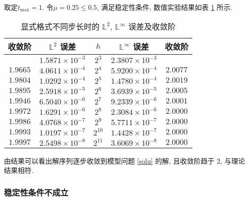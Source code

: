 \documentclass[UTF8, a4paper, 12pt, oneside, onecolumn]{article}
\begin{document}
取定$t_{\max} =1$. 令$\mu = 0.25\leq 0.5$, 满足稳定性条件, 数值实验结果如表 \ref{tab:expliciterr1} 所示.
\begin{table}[H]\centering\heiti{}
	\caption{显式格式不同步长时的 $\mathbb{L}^2$, $\mathbb{L}^\infty$ 误差及收敛阶}\label{tab:expliciterr1}
	\begin{tabular}{|c|c|c|c|c|}\hline
		收敛阶	&	$\mathbb{L}^2$ 误差	&	$h$	&	$\mathbb{L}^\infty$ 误差		&	收敛阶\\\hline			&	$1.5871 \times 10^{-3}$	&	$2^3$	&	$2.3807 \times 10^{-3}$	&	\\\hline
		$1.9665$	&	$4.0611 \times 10^{-4}$	&	$2^4$	&	$5.9200 \times 10^{-4}$	&	$2.0077$\\\hline
		$1.9804$	&	$1.0292 \times 10^{-4}$	&	$2^5$	&	$1.4780 \times 10^{-4}$	&	$2.0019$\\\hline
		$1.9895$	&	$2.5918 \times 10^{-5}$	&	$2^6$	&	$3.6939 \times 10^{-5}$	&	$2.0005$\\\hline
		$1.9946$	&	$6.5040 \times 10^{-6}$	&	$2^7$	&	$9.2339 \times 10^{-6}$	&	$2.0001$\\\hline
		$1.9972$	&	$1.6291 \times 10^{-6}$	&	$2^8$	&	$2.3084 \times 10^{-6}$	&	$2.0000$\\\hline
		$1.9986$	&	$4.0768 \times 10^{-7}$	&	$2^9$	&	$5.7711 \times 10^{-7}$	&	$2.0000$\\\hline
		$1.9993$	&	$1.0197 \times 10^{-7}$	&	$2^{10}$	&	$1.4428 \times 10^{-7}$	&	$2.0000$\\\hline
		$1.9997$	&	$2.5498 \times 10^{-8}$	&	$2^{11}$	&	$3.6069 \times 10^{-8}$	&	$2.0000$\\\hline		
	\end{tabular}
\end{table}
\noindent 由结果可以看出解序列逐步收敛到模型问题 \eqref{solu} 的解, 且收敛阶趋于 $2$, 与理论结果相符.


\subsubsection{稳定性条件不成立}
\end{document}
